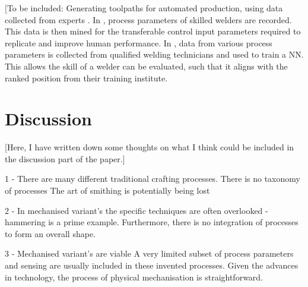 [To be included: Generating toolpaths for automated production, using data collected from experts \citep{Ng2017}. In \citep{French2019}, process parameters of skilled welders are recorded. This data is then mined for the transferable control input parameters required to replicate and improve human performance. In \citep{Kumar2018}, data from various process parameters is collected from   qualified welding technicians and used to train a NN. This allows the skill of a welder can be evaluated, such that it aligns with the ranked position from their training institute.










\section{Discussion}

[Here, I have written down some thoughts on what I think could be included in the discussion part of the paper.]

 
 1 - There are many different traditional crafting processes.
There is no taxonomy of processes
The art of smithing is potentially being lost

2 - In mechanised variant's the specific techniques are often overlooked - hammering is a prime example.
Furthermore, there is no integration of processes to form an overall shape.
 
3 -  Mechanised variant's are viable
A very limited subset of process parameters and sensing are usually included in these invented processes. 
Given the advances in technology, the process of physical mechanisation is straightforward. 


